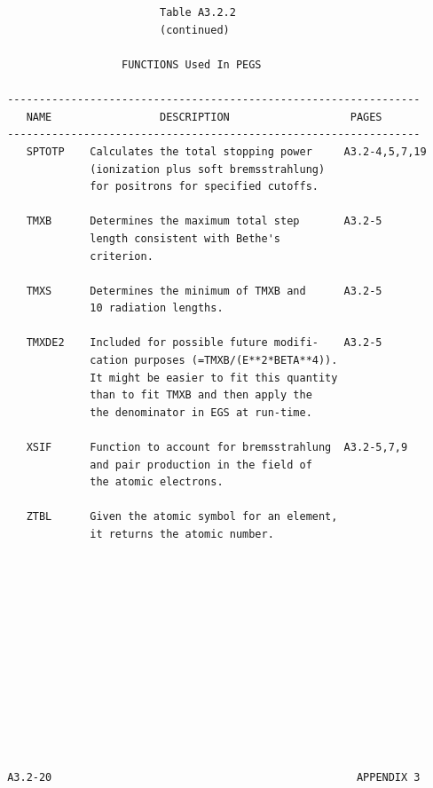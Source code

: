 \newpage  {}\begin{verbatim}
 
 
                         Table A3.2.2
                         (continued)
 
                   FUNCTIONS Used In PEGS
 
 -----------------------------------------------------------------
    NAME                 DESCRIPTION                   PAGES
 -----------------------------------------------------------------
    SPTOTP    Calculates the total stopping power     A3.2-4,5,7,19
              (ionization plus soft bremsstrahlung)
              for positrons for specified cutoffs.
 
    TMXB      Determines the maximum total step       A3.2-5
              length consistent with Bethe's
              criterion.
 
    TMXS      Determines the minimum of TMXB and      A3.2-5
              10 radiation lengths.
 
    TMXDE2    Included for possible future modifi-    A3.2-5
              cation purposes (=TMXB/(E**2*BETA**4)).
              It might be easier to fit this quantity
              than to fit TMXB and then apply the
              the denominator in EGS at run-time.
 
    XSIF      Function to account for bremsstrahlung  A3.2-5,7,9
              and pair production in the field of
              the atomic electrons.
 
    ZTBL      Given the atomic symbol for an element,
              it returns the atomic number.
 
 
 
 
 
 
 
 
 
 
 
 
 
 A3.2-20                                                APPENDIX 3
\end{verbatim} 
\newpage {} 
   
\label{pegs4_input}
